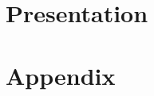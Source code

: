 \documentclass[a4paper,11pt,twoside,parskip=half,numbers=noenddot,bibliography=totocnumbered,listof = totoc]{scrbook}
\begin{document}

\frontmatter
%

\cleardoublepage
%

\cleardoublepage
\dominitoc
\tableofcontents
%
%
%

\mainmatter

\part{Presentation}
%

%
%
%
%
%

\footnotesize
{} %

\normalsize

\appendix

\part{Appendix}
%
%
%
%
%
%
%
%

\end{document}
